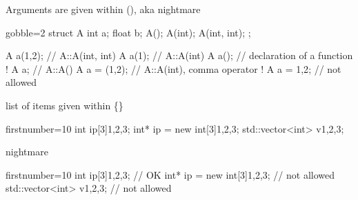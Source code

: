 \begin{frame}[fragile]
  \begin{block}{Arguments are given within (), aka  nightmare}
    \begin{cppcode*}{gobble=2}
      struct A {
        int a;
        float b;
        A();
        A(int);
        A(int, int);
      };

      A a(1,2);    // A::A(int, int)
      A a(1);      // A::A(int)
      A a();       // declaration of a function !
      A a;         // A::A()
      A a = (1,2); // A::A(int), comma operator !
      A a = {1,2}; // not allowed
    \end{cppcode*}
  \end{block}
\end{frame}

\begin{frame}[fragile]
  \begin{exampleblock}{list of items given within \{\}}
    \begin{cppcode*}{firstnumber=10}
     int ip[3]{1,2,3};
     int* ip = new int[3]{1,2,3};
     std::vector<int> v{1,2,3};
    \end{cppcode*}
  \end{exampleblock}
  \pause
  \begin{block}{ nightmare}
    \begin{cppcode*}{firstnumber=10}
     int ip[3]{1,2,3};            // OK
     int* ip = new int[3]{1,2,3}; // not allowed
     std::vector<int> v{1,2,3};   // not allowed
    \end{cppcode*}
  \end{block}
\end{frame}

